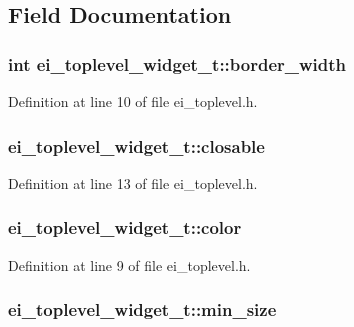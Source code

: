 \subsection{Field Documentation}
\hypertarget{structei__toplevel__widget__t_a6f8b26f1614ee8f1e552e6792d49e90b}{
\subsubsection[{border\_\-width}]{\setlength{\rightskip}{0pt plus 5cm}int {\bf ei\_\-toplevel\_\-widget\_\-t::border\_\-width}}}
\label{structei__toplevel__widget__t_a6f8b26f1614ee8f1e552e6792d49e90b}


Definition at line 10 of file ei\_\-toplevel.h.\hypertarget{structei__toplevel__widget__t_a1710c07d0ecdc5129c984cc98ec08507}{
\subsubsection[{closable}]{ {\bf ei\_\-toplevel\_\-widget\_\-t::closable}}}
\label{structei__toplevel__widget__t_a1710c07d0ecdc5129c984cc98ec08507}


Definition at line 13 of file ei\_\-toplevel.h.\hypertarget{structei__toplevel__widget__t_a2d580b44e8d350f1b6d5af8d84802bc0}{
\subsubsection[{color}]{ {\bf ei\_\-toplevel\_\-widget\_\-t::color}}}
\label{structei__toplevel__widget__t_a2d580b44e8d350f1b6d5af8d84802bc0}


Definition at line 9 of file ei\_\-toplevel.h.\hypertarget{structei__toplevel__widget__t_ae41d0fe8cf4a4a5a52de040eff29f60a}{
\subsubsection[{min\_\-size}]{ {\bf ei\_\-toplevel\_\-widget\_\-t::min\_\-size}}}
\label{structei__toplevel__widget__t_ae41d0fe8cf4a4a5a52de040eff29f60a}


